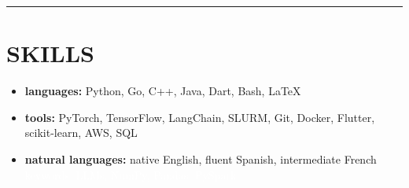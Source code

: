 \documentclass[11pt,letterpaper]{article}
\newcommand*{\cvsection}[1]{
  \vspace{2mm}
  \hrule
  \vspace*{-0.6em}
  \section*{#1}
  \vspace*{-0.4em}
}
\begin{document}
\cvsection{SKILLS}

\begin{minipage}{\linewidth}
  \small\begin{multicols}{2}
    \begin{itemize}
      \setlength\itemsep{0ex}
      \item \textbf{languages:} Python, Go, C++, Java, Dart, Bash, \LaTeX{}
      \item \textbf{tools:} PyTorch, TensorFlow, LangChain, SLURM, Git, Docker, Flutter, scikit-learn, AWS, SQL
      \item \textbf{natural languages:} native English, fluent Spanish, intermediate French
            \textcolor{white}{keywords: LLMs, NumPy, Pandas, PySpark}
    \end{itemize}
  \end{multicols}
\end{minipage}
\end{document}
